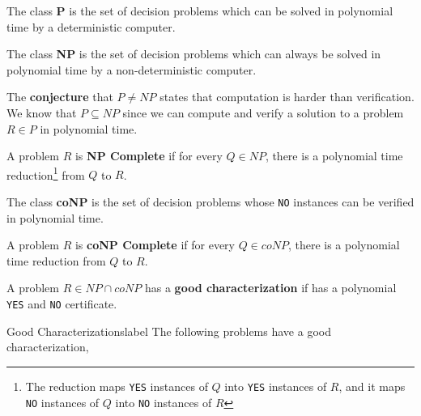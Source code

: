  	\begin{defn}[P]
 		The class \textbf{P} is the set of decision problems which can be solved in polynomial time by a deterministic computer.
 	\end{defn}

 	\begin{defn}[NP]
 		The class \textbf{NP} is the set of decision problems which can always be solved in polynomial time by a non-deterministic computer.
 	\end{defn}

 	\begin{rmk}[$P \neq NP$]
 		The \textbf{conjecture} that $P \neq NP$ states that computation is harder than verification. We know that $P \subseteq NP$ since we can compute and verify a solution to a problem $R \in P$ in polynomial time.
 	\end{rmk}

 	\begin{defn}[NP Complete]
 		A problem $R$ is \textbf{NP Complete} if for every $Q \in NP$, there is a polynomial time reduction\footnote{The reduction maps \texttt{YES} instances of $Q$ into \texttt{YES} instances of $R$, and it maps \texttt{NO} instances of $Q$ into \texttt{NO} instances of $R$} from $Q$ to $R$.
 	\end{defn}

 	 \begin{defn}[coNP]
 	 	 The class \textbf{coNP} is the set of decision problems whose \texttt{NO} instances can be verified in polynomial time.
 	\end{defn}

 	\begin{defn}
 		A problem $R$ is \textbf{coNP Complete} if for every $Q \in coNP$, there is a polynomial time reduction from $Q$ to $R$.
 	\end{defn}

 	\begin{defn}
 		A problem $R \in NP \cap coNP$ has a \textbf{good characterization} if has a polynomial \texttt{YES} and \texttt{NO} certificate.  
 	\end{defn}

 	\begin{ex}{Good Characterizations}{label}
 		The following problems have a good characterization,

 		\vphantom{.}

 	\end{ex}

